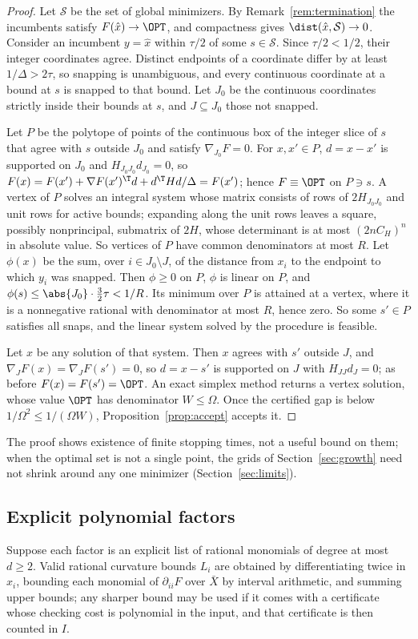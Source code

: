 \begin{proof}
Let $\mathcal S$ be the set of global minimizers. By
Remark~\ref{rem:termination} the incumbents satisfy $F(\hat x)\to\OPT$,
and compactness gives $\dist(\hat x,\mathcal S)\to0$. Consider an incumbent
$y=\hat x$ within $\tau/2$ of some $s\in\mathcal S$. Since $\tau/2<1/2$,
their integer coordinates agree. Distinct endpoints of a coordinate differ
by at least $1/\Delta>2\tau$, so snapping is unambiguous, and every continuous
coordinate at a bound at $s$ is snapped to that bound. Let $J_0$ be the
continuous coordinates strictly inside their bounds at $s$, and
$J\subseteq J_0$ those not snapped.

Let $P$ be the polytope of points of the continuous box of the integer slice
of $s$ that agree with $s$ outside $J_0$ and satisfy $\nabla_{J_0}F=0$. For
$x,x'\in P$, $d=x-x'$ is supported on $J_0$ and $H_{J_0J_0}d_{J_0}=0$, so
$F(x)=F(x')+\nabla F(x')^\T d+d^\T Hd/\Delta=F(x')$; hence $F\equiv\OPT$ on
$P\ni s$. A vertex of $P$ solves an integral system whose matrix consists of
rows of $2H_{J_0J_0}$ and unit rows for active bounds; expanding along the
unit rows leaves a square, possibly nonprincipal, submatrix of $2H$, whose
determinant is at most $(2nC_H)^n$ in absolute value. So vertices of $P$
have common denominators at most $R$. Let $\phi(x)$ be the sum, over
$i\in J_0\setminus J$, of the distance from $x_i$ to the endpoint to which
$y_i$ was snapped. Then $\phi\ge0$ on $P$, $\phi$ is linear on $P$, and
$\phi(s)\le\abs{J_0}\cdot\frac32\tau<1/R$. Its minimum over $P$ is attained at
a vertex, where it is a nonnegative rational with denominator at most $R$,
hence zero. So some $s'\in P$ satisfies all snaps, and the linear system
solved by the procedure is feasible.

Let $x$ be any solution of that system. Then $x$ agrees with $s'$ outside
$J$, and $\nabla_JF(x)=\nabla_JF(s')=0$, so $d=x-s'$ is supported on $J$
with $H_{JJ}d_J=0$; as before $F(x)=F(s')=\OPT$. An exact simplex method
returns a vertex solution, whose value $\OPT$ has denominator $W\le\Omega$. Once
the certified gap is below $1/\Omega^2\le1/(\Omega W)$, Proposition~\ref{prop:accept}
accepts it.
\end{proof}

The proof shows existence of finite stopping times, not a useful bound on
them; when the optimal set is not a single point, the grids of
Section~\ref{sec:growth} need not shrink around any one minimizer
(Section~\ref{sec:limits}).

\subsection{Explicit polynomial factors}\label{sec:polynomial}
Suppose each factor is an explicit list of rational monomials of degree at
most $d\ge2$. Valid rational curvature bounds $L_i$ are obtained by
differentiating twice in $x_i$, bounding each monomial of $\partial_{ii}F$
over $\bar X$ by interval arithmetic, and summing upper bounds; any sharper
bound may be used if it comes with a certificate whose checking cost is
polynomial in the input, and that certificate is then counted in $I$.

